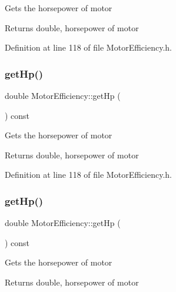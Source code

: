 Gets the horsepower of motor

\begin{DoxyReturn}{Returns}
double, horsepower of motor 
\end{DoxyReturn}


Definition at line 118 of file Motor\+Efficiency.\+h.

\mbox{\label{class_motor_efficiency_a9f88159c82daa270975d7969debe88a9}} 
\subsubsection{\texorpdfstring{get\+Hp()}{getHp()}\hspace{0.1cm}{\footnotesize\ttfamily [2/3]}}
{\footnotesize\ttfamily double Motor\+Efficiency\+::get\+Hp (\begin{DoxyParamCaption}{ }\end{DoxyParamCaption}) const\hspace{0.3cm}{\ttfamily [inline]}}

Gets the horsepower of motor

\begin{DoxyReturn}{Returns}
double, horsepower of motor 
\end{DoxyReturn}


Definition at line 118 of file Motor\+Efficiency.\+h.

\mbox{\label{class_motor_efficiency_a9f88159c82daa270975d7969debe88a9}} 
\subsubsection{\texorpdfstring{get\+Hp()}{getHp()}\hspace{0.1cm}{\footnotesize\ttfamily [3/3]}}
{\footnotesize\ttfamily double Motor\+Efficiency\+::get\+Hp (\begin{DoxyParamCaption}{ }\end{DoxyParamCaption}) const\hspace{0.3cm}{\ttfamily [inline]}}

Gets the horsepower of motor

\begin{DoxyReturn}{Returns}
double, horsepower of motor 
\end{DoxyReturn}


